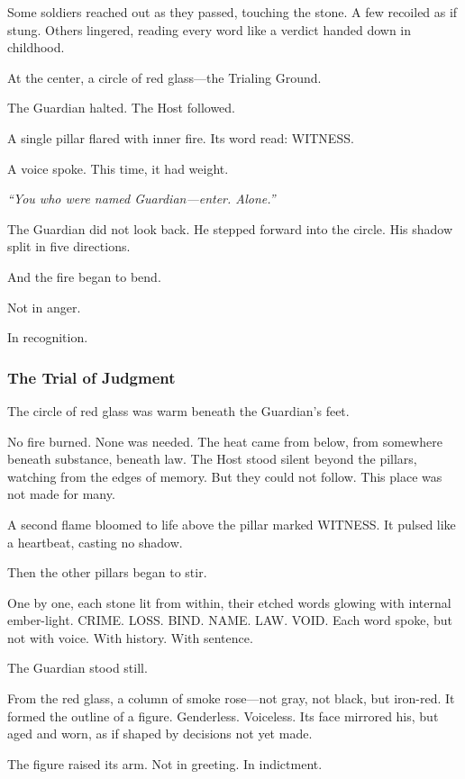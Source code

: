 \documentclass[12pt]{article}
\begin{document}
Some soldiers reached out as they passed, touching the stone. A few recoiled as if stung. Others lingered, reading every word like a verdict handed down in childhood.

At the center, a circle of red glass—the Trialing Ground.

The Guardian halted. The Host followed.

A single pillar flared with inner fire. Its word read: \textsc{WITNESS}.

A voice spoke. This time, it had weight.

\textit{``You who were named Guardian—enter. Alone.''}

The Guardian did not look back. He stepped forward into the circle. His shadow split in five directions.

And the fire began to bend.

Not in anger.

In recognition.

\dotfill

\subsubsection*{The Trial of Judgment}

The circle of red glass was warm beneath the Guardian’s feet.

No fire burned. None was needed. The heat came from below, from somewhere beneath substance, beneath law. The Host stood silent beyond the pillars, watching from the edges of memory. But they could not follow. This place was not made for many.

A second flame bloomed to life above the pillar marked \textsc{WITNESS}. It pulsed like a heartbeat, casting no shadow.

Then the other pillars began to stir.

One by one, each stone lit from within, their etched words glowing with internal ember-light. \textsc{CRIME}. \textsc{LOSS}. \textsc{BIND}. \textsc{NAME}. \textsc{LAW}. \textsc{VOID}. Each word spoke, but not with voice. With history. With sentence.

The Guardian stood still.

From the red glass, a column of smoke rose—not gray, not black, but iron-red. It formed the outline of a figure. Genderless. Voiceless. Its face mirrored his, but aged and worn, as if shaped by decisions not yet made.

The figure raised its arm. Not in greeting. In indictment.
\end{document}
